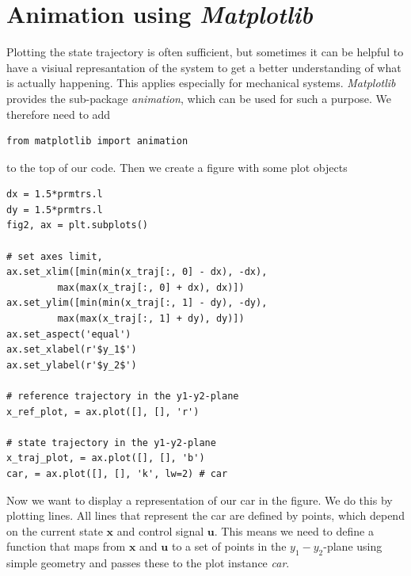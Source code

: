 \documentclass[a4paper,11pt,headings=standardclasses]{scrartcl}%
\newcommand{\mpl}{\emph{Matplotlib}\,}
\begin{document}
\newpage
\section{Animation using \mpl}
\label{sec:animation}
Plotting the state trajectory is often sufficient, but sometimes it can be helpful to have a visiual represantation of the system to get a better understanding of what is actually happening. This applies especially for mechanical systems.
\mpl provides the sub-package \emph{animation}, which can be used for such a purpose. We therefore need to add 
\begin{lstlisting}
from matplotlib import animation
\end{lstlisting}
to the top of our code. Then we create a figure with some plot objects
\begin{lstlisting}
dx = 1.5*prmtrs.l
dy = 1.5*prmtrs.l
fig2, ax = plt.subplots()
    
# set axes limit, 
ax.set_xlim([min(min(x_traj[:, 0] - dx), -dx), 
         max(max(x_traj[:, 0] + dx), dx)])
ax.set_ylim([min(min(x_traj[:, 1] - dy), -dy), 
         max(max(x_traj[:, 1] + dy), dy)])
ax.set_aspect('equal')
ax.set_xlabel(r'$y_1$')
ax.set_ylabel(r'$y_2$')

# reference trajectory in the y1-y2-plane
x_ref_plot, = ax.plot([], [], 'r') 

# state trajectory in the y1-y2-plane
x_traj_plot, = ax.plot([], [], 'b') 
car, = ax.plot([], [], 'k', lw=2) # car
\end{lstlisting}
Now we want to display a representation of our car in the figure. We do this by plotting lines. All lines that represent the car are defined by points, which depend on the current state $\mathbf{x}$ and control signal $\mathbf{u}$. This means we need to define a function that maps from $\mathbf{x}$ and $\mathbf{u}$ to a set of points in the $y_1-y_2$-plane using simple geometry and passes these to the plot instance \emph{car}.
\end{document}
